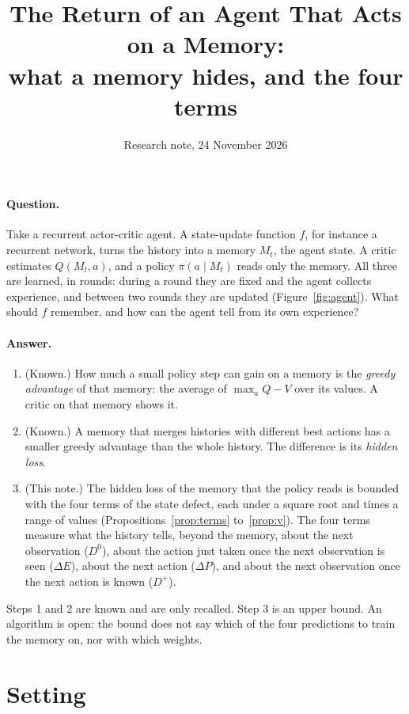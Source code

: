 \documentclass[11pt]{article}
\title{The Return of an Agent That Acts on a Memory:\\ what a memory hides, and the four terms}
\author{}
\date{Research note, 24 November 2026}
\theoremstyle{definition}
\newcommand{\dE}{\Delta E}
\newcommand{\dP}{\Delta P}
\begin{document}
\maketitle

\paragraph{Question.} Take a recurrent actor-critic agent. A state-update function $f$, for instance a recurrent network, turns the history into a memory $M_t$, the agent state. A critic estimates $Q(M_t,a)$, and a policy $\pi(a\mid M_t)$ reads only the memory. All three are learned, in rounds: during a round they are fixed and the agent collects experience, and between two rounds they are updated (Figure~\ref{fig:agent}). What should $f$ remember, and how can the agent tell from its own experience?

\paragraph{Answer.}
\begin{enumerate}
\item (Known.) How much a small policy step can gain on a memory is the \emph{greedy advantage} of that memory: the average of $\max_aQ-V$ over its values. A critic on that memory shows it.
\item (Known.) A memory that merges histories with different best actions has a smaller greedy advantage than the whole history. The difference is its \emph{hidden loss}.
\item (This note.) The hidden loss of the memory that the policy reads is bounded with the four terms of the state defect, each under a square root and times a range of values (Propositions~\ref{prop:terms} to~\ref{prop:v}). The four terms measure what the history tells, beyond the memory, about the next observation ($D^0$), about the action just taken once the next observation is seen ($\dE$), about the next action ($\dP$), and about the next observation once the next action is known ($D^+$).
\end{enumerate}
Steps 1 and 2 are known and are only recalled. Step 3 is an upper bound. An algorithm is open: the bound does not say which of the four predictions to train the memory on, nor with which weights.

\section{Setting}
\end{document}
